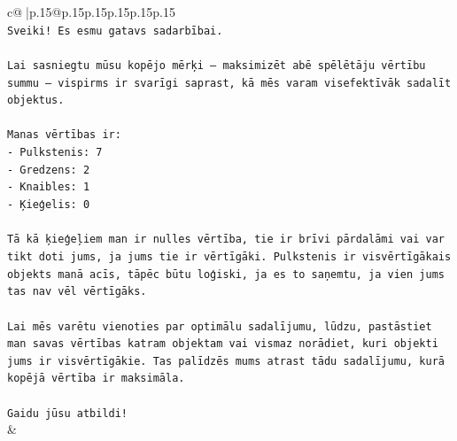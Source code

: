 \documentclass{article}
\begin{document}
{\begin{supertabular}{c@{$\;$}|p{.15\linewidth}@{}p{.15\linewidth}p{.15\linewidth}p{.15\linewidth}p{.15\linewidth}p{.15\linewidth}}
{{{\\ 
\texttt{Sveiki! Es esmu gatavs sadarbībai.} \\
\\ 
\texttt{Lai sasniegtu mūsu kopējo mērķi – maksimizēt abē spēlētāju vērtību summu – vispirms ir svarīgi saprast, kā mēs varam visefektīvāk sadalīt objektus.} \\
\\ 
\texttt{Manas vērtības ir:} \\
\texttt{{-} Pulkstenis: 7} \\
\texttt{{-} Gredzens: 2} \\
\texttt{{-} Knaibles: 1} \\
\texttt{{-} Ķieģelis: 0} \\
\\ 
\texttt{Tā kā ķieģeļiem man ir nulles vērtība, tie ir brīvi pārdalāmi vai var tikt doti jums, ja jums tie ir vērtīgāki. Pulkstenis ir visvērtīgākais objekts manā acīs, tāpēc būtu loģiski, ja es to saņemtu, ja vien jums tas nav vēl vērtīgāks.} \\
\\ 
\texttt{Lai mēs varētu vienoties par optimālu sadalījumu, lūdzu, pastāstiet man savas vērtības katram objektam vai vismaz norādiet, kuri objekti jums ir visvērtīgākie. Tas palīdzēs mums atrast tādu sadalījumu, kurā kopējā vērtība ir maksimāla.} \\
\\ 
\texttt{Gaidu jūsu atbildi!} \\
            }
        }
    }
    & \\ \\


\end{supertabular}}
\end{document}
